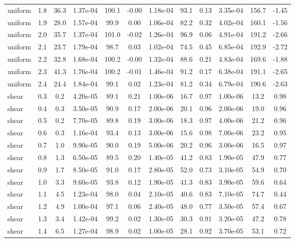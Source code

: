 \begin{table}[h!]
\begin{tabular}{ll c ccc ccc ccc}
\midrule
uniform & 1.8 & 36.3 & 1.37e-04 & 100.1 & -0.00 & 1.18e-04 & 93.1 & 0.13 & 3.35e-04 & 156.7 & -1.45 \\
uniform & 1.9 & 28.0 & 1.57e-04 & 99.9 & 0.00 & 1.06e-04 & 82.2 & 0.32 & 4.02e-04 & 160.1 & -1.56 \\
uniform & 2.0 & 35.7 & 1.37e-04 & 101.0 & -0.02 & 1.26e-04 & 96.9 & 0.06 & 4.91e-04 & 191.2 & -2.66 \\
uniform & 2.1 & 23.7 & 1.79e-04 & 98.7 & 0.03 & 1.02e-04 & 74.5 & 0.45 & 6.85e-04 & 192.9 & -2.72 \\
uniform & 2.2 & 32.8 & 1.68e-04 & 100.2 & -0.00 & 1.32e-04 & 88.6 & 0.21 & 4.83e-04 & 169.6 & -1.88 \\
uniform & 2.3 & 41.3 & 1.76e-04 & 100.2 & -0.01 & 1.46e-04 & 91.2 & 0.17 & 6.38e-04 & 191.1 & -2.65 \\
uniform & 2.4 & 24.4 & 1.84e-04 & 99.1 & 0.02 & 1.23e-04 & 81.2 & 0.34 & 6.79e-04 & 190.6 & -2.63 \\
\midrule
\midrule\midrule
shear & 0.3 & 0.2 & 4.20e-05 & 89.1 & 0.21 & 1.00e-06 & 16.7 & 0.97 & 1.00e-06 & 13.2 & 0.98 \\
shear & 0.4 & 0.3 & 3.50e-05 & 90.9 & 0.17 & 2.00e-06 & 20.1 & 0.96 & 2.00e-06 & 19.0 & 0.96 \\
shear & 0.5 & 0.2 & 7.70e-05 & 89.8 & 0.19 & 3.00e-06 & 18.3 & 0.97 & 4.00e-06 & 21.2 & 0.96 \\
shear & 0.6 & 0.3 & 1.16e-04 & 93.4 & 0.13 & 3.00e-06 & 15.6 & 0.98 & 7.00e-06 & 23.2 & 0.95 \\
shear & 0.7 & 1.0 & 9.90e-05 & 90.0 & 0.19 & 5.00e-06 & 20.2 & 0.96 & 3.00e-06 & 16.5 & 0.97 \\
shear & 0.8 & 1.3 & 6.50e-05 & 89.5 & 0.20 & 1.40e-05 & 41.2 & 0.83 & 1.90e-05 & 47.9 & 0.77 \\
shear & 0.9 & 1.7 & 8.50e-05 & 91.0 & 0.17 & 2.80e-05 & 52.0 & 0.73 & 3.10e-05 & 54.9 & 0.70 \\
shear & 1.0 & 3.3 & 9.60e-05 & 93.8 & 0.12 & 1.90e-05 & 41.3 & 0.83 & 3.90e-05 & 59.6 & 0.64 \\
shear & 1.1 & 4.5 & 1.23e-04 & 98.0 & 0.04 & 2.10e-05 & 40.6 & 0.83 & 7.10e-05 & 74.7 & 0.44 \\
shear & 1.2 & 4.9 & 1.00e-04 & 97.1 & 0.06 & 2.40e-05 & 48.0 & 0.77 & 3.50e-05 & 57.4 & 0.67 \\
shear & 1.3 & 3.4 & 1.42e-04 & 99.2 & 0.02 & 1.30e-05 & 30.3 & 0.91 & 3.20e-05 & 47.2 & 0.78 \\
shear & 1.4 & 6.5 & 1.27e-04 & 98.9 & 0.02 & 1.00e-05 & 28.1 & 0.92 & 3.70e-05 & 53.1 & 0.72 \\

\end{tabular}
\end{table}
